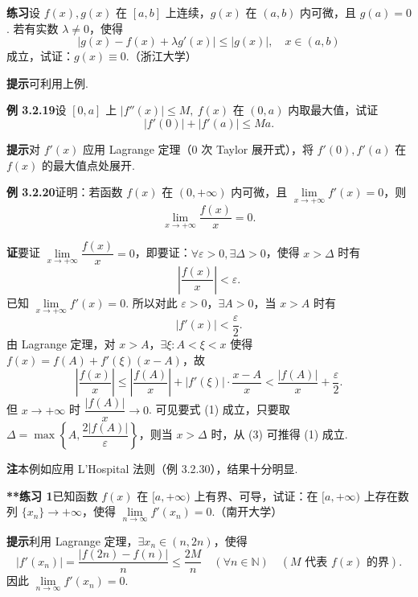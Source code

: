 \documentclass[UTF8, 12pt, fontset=fandol, oneside]{ctexart}
\begin{document}
\noindent\textbf{练习}\quad 设 $f(x),g(x)$ 在 $[a,b]$ 上连续，$g(x)$ 在 $(a,b)$ 内可微，且 $g(a)=0$. 若有实数 $\lambda\ne0$，使得
\[
  |g(x)-f(x)+\lambda g'(x)|\le |g(x)|,\quad x\in(a,b)
\tag{1}
\]
成立，试证：$g(x)\equiv0$.（浙江大学）

\noindent\textbf{提示}\quad 可利用上例.

\noindent\textbf{例 3.2.19}\quad 设 $[0,a]$ 上 $|f''(x)|\le M,\ f(x)$ 在 $(0,a)$ 内取最大值，试证
\[
  |f'(0)|+|f'(a)|\le Ma.
\]

\noindent\textbf{提示}\quad 对 $f'(x)$ 应用 Lagrange 定理（0 次 Taylor 展开式），将 $f'(0),f'(a)$ 在 $f(x)$ 的最大值点处展开.

\noindent\textbf{例 3.2.20}\quad 证明：若函数 $f(x)$ 在 $(0,+\infty)$ 内可微，且 $\lim\limits_{x\to+\infty}f'(x)=0$，则
\[
  \lim_{x\to+\infty}\frac{f(x)}x=0.
\]

\noindent\textbf{证}\quad 要证 $\lim\limits_{x\to+\infty}\dfrac{f(x)}x=0$，即要证：$\forall\varepsilon>0,\exists\Delta>0$，使得 $x>\Delta$ 时有
\begin{equation}
  \left|\frac{f(x)}x\right|<\varepsilon.
\tag{1}
\end{equation}
已知 $\lim\limits_{x\to+\infty}f'(x)=0$. 所以对此 $\varepsilon>0$，$\exists A>0$，当 $x>A$ 时有
\begin{equation}
  |f'(x)|<\frac{\varepsilon}{2}.
\tag{2}
\end{equation}
由 Lagrange 定理，对 $x>A$，$\exists\xi:A<\xi<x$ 使得 $f(x)=f(A)+f'(\xi)(x-A)$，故
\begin{equation}
  \left|\frac{f(x)}x\right|\le\left|\frac{f(A)}x\right|+|f'(\xi)|\cdot\frac{x-A}{x}
  <\frac{|f(A)|}{x}+\frac{\varepsilon}{2}.
\tag{3}
\end{equation}
但 $x\to+\infty$ 时 $\dfrac{|f(A)|}{x}\to0$. 可见要式 (1) 成立，只要取 $\Delta=\max\left\{A,\dfrac{2|f(A)|}{\varepsilon}\right\}$，则当 $x>\Delta$ 时，从 (3) 可推得 (1) 成立.

\noindent\textbf{注}\quad 本例如应用 L'Hospital 法则（例 3.2.30），结果十分明显.

\noindent\textbf{**练习 1}\quad 已知函数 $f(x)$ 在 $[a,+\infty)$ 上有界、可导，试证：在 $[a,+\infty)$ 上存在数列 $\{x_n\}\to+\infty$，使得 $\lim\limits_{n\to\infty}f'(x_n)=0$.（南开大学）

\noindent\textbf{提示}\quad 利用 Lagrange 定理，$\exists x_n\in(n,2n)$，使得
\[
  |f'(x_n)|=\frac{|f(2n)-f(n)|}{n}\le\frac{2M}{n}\quad(\forall n\in\mathbb N)\quad(M\text{ 代表 }f(x)\text{ 的界}).
\]
因此 $\lim\limits_{n\to\infty}f'(x_n)=0$.
\end{document}
